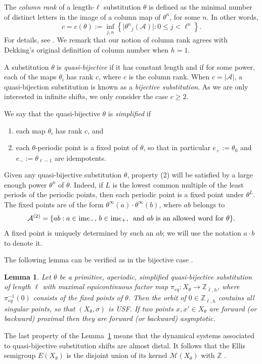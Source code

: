 \documentclass[10pt,a4paper]{amsart}
\newtheorem{lemma}[theorem]{Lemma}
\numberwithin{equation}{section}
\newcommand{\Z}{\mathbb Z}
\newcommand{\pe}{\pi_{eq}}
\newcommand{\M}{\mathcal M}
\newcommand{\im}{\mbox{\rm im}}
\begin{document}
The {\em column rank} of a length-$\ell$ substitution $\theta$  is defined as the minimal number of distinct letters in the image of a column map of $\theta^{n}$, for some $n$. In other words,
\begin{equation} \label{eq:dolumnnumber}c=c (\theta) := \inf_{j,n} \left\{\lvert {\theta^n}_j(\mathcal A)\rvert  : 0\le j <  \ell^n\right\}.\end{equation} 
For details, see \cite{dekking}. We remark that our notion of column rank agrees with Dekking's original definition of column number when $h=1$.  

A substitution $\theta$ is {\em quasi-bijective} if it has constant length and if for some power,  each of the maps $\theta_i$ has rank $c$, where $c$ is the column rank. When $c=|\mathcal A|$, a quasi-bijection substitution is known as a {\em bijective substitution}. As we are only interested in infinite shifts, we only consider  the case $c\geq 2$.
 
 We say that {the quasi-bijective} $\theta$ is {\em simplified} if
 \begin{enumerate}
 \item{each map $\theta_i$ has rank $c$, and}
 \item each $\theta$-periodic point is a fixed point of $\theta$, so that in particular $e_+:=\theta_0 $ and $e_-:= \theta_{\ell-1}$ are idempotents.
  \end{enumerate}
Given any quasi-bijective substitution $\theta$, property  (2) will be satisfied by a large enough power $\theta^n$ of $\theta$. Indeed,  if $L$ is the lowest common multiple of the least periods of the periodic points, then each periodic point is a fixed point under $\theta^L$. The fixed points are of the form $\theta^{\infty}(a)\cdot\theta^{\infty}(b)$, where $ab$ belongs to 
\[ \mathcal A^{(2)} = \{ ab: a\in \im e_- ,\,   b\in \im e_+, \,  \mbox{ and } ab \mbox{ is an allowed word for $\theta$}\}.\]
A fixed point is uniquely determined by such an $ab$;  
we will use the notation $a\cdot b$ to denote it.  

The following lemma can be verified as in the bijective case \cite{ESBS}.

\begin{lemma}\label{lem:unique-singular-fibre}
Let $\theta$ be a primitive, aperiodic, simplified  quasi-bijective substitution of length $\ell$ with maximal equicontinuous factor map
$\pe:X_\theta\to\Z_{\bar{\ell},h}$, where $\pe^{-1}(0)$ consists of the fixed points of $\theta$. Then the orbit of $0\in \Z_{\bar{\ell},h}$ contains all singular points, 
so that  $(X_\theta,\sigma)$ is USF. 
If two points $x,x'\in X_\theta$ are forward (or backward) proximal then they are forward (or backward) asymptotic. 
 \end{lemma}
The last property of the Lemma~\ref{lem:unique-singular-fibre} means that the dynamical systems associated to quasi-bijective substitution shifts are almost distal.
It follows that the Ellis semigroup $E(X_\theta)$ is the disjoint union of its kernel $\M(X_\theta)$ with $\Z$ \cite{Barge-Kellendonk}.
\end{document}
